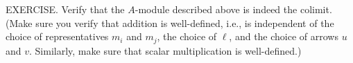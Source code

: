 EXERCISE. Verify that the $A$-module described above is indeed the colimit. (Make sure you verify that addition is well-defined, i.e., is independent of the choice of representatives $m_i$ and $m_j$, the choice of $\ell$, and the choice of arrows $u$ and $v$. Similarly, make sure that scalar multiplication is well-defined.)
